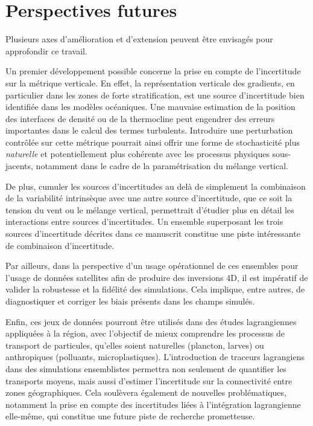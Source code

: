 \section{Perspectives futures}

Plusieurs axes d’amélioration et d’extension peuvent être envisagés pour approfondir ce travail.

Un premier développement possible concerne la prise en compte de l’incertitude sur la métrique verticale. En effet, la représentation verticale des gradients, en particulier dans les zones de forte stratification, est une source d’incertitude bien identifiée dans les modèles océaniques. Une mauvaise estimation de la position des interfaces de densité ou de la thermocline peut engendrer des erreurs importantes dans le calcul des termes turbulents. Introduire une perturbation contrôlée sur cette métrique pourrait ainsi offrir une forme de stochasticité plus \textit{naturelle} et potentiellement plus cohérente avec les processus physiques sous-jacents, notamment dans le cadre de la paramétrisation du mélange vertical.

De plus, cumuler les sources d'incertitudes au delà de simplement la combinaison de la variabilité intrinsèque avec une autre source d'incertitude, que ce soit la tension du vent ou le mélange vertical, permettrait d'étudier plus en détail les interactions entre sources d'incertitudes. Un ensemble superposant les trois sources d'incertitude décrites dans ce manuscrit constitue une piste intéressante de combinaison d'incertitude.

Par ailleurs, dans la perspective d’un usage opérationnel de ces ensembles pour l'usage de données satellites afin de produire des inversions 4D, il est impératif de valider la robustesse et la fidélité des simulations. Cela implique, entre autres, de diagnostiquer et corriger les biais présents dans les champs simulés.

Enfin, ces jeux de données pourront être utilisés dans des études lagrangiennes \cite{popov_ensemble_2024} appliquées à la région, avec l’objectif de mieux comprendre les processus de transport de particules, qu’elles soient naturelles (plancton, larves) ou anthropiques (polluants, microplastiques). L’introduction de traceurs lagrangiens dans des simulations ensemblistes permettra non seulement de quantifier les transports moyens, mais aussi d’estimer l’incertitude sur la connectivité entre zones géographiques. Cela soulèvera également de nouvelles problématiques, notamment la prise en compte des incertitudes liées à l’intégration lagrangienne elle-même, qui constitue une future piste de recherche prometteuse.